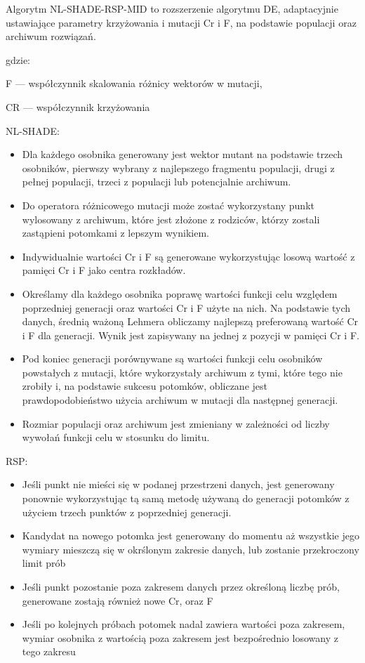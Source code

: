 Algorytm NL-SHADE-RSP-MID to rozszerzenie algorytmu DE, adaptacyjnie ustawiające parametry krzyżowania i mutacji Cr i F, na podstawie populacji oraz archiwum rozwiązań.

gdzie:

F — współczynnik skalowania różnicy wektorów w mutacji,

CR — współczynnik krzyżowania


NL-SHADE: 
\begin{itemize}
    \item Dla każdego osobnika generowany jest wektor mutant na podstawie trzech osobników, pierwszy wybrany z najlepszego fragmentu populacji, drugi z pełnej populacji, trzeci z populacji lub potencjalnie archiwum.

    \item Do operatora różnicowego mutacji może zostać wykorzystany punkt wylosowany z archiwum, które jest złożone z rodziców, którzy zostali zastąpieni potomkami z lepszym wynikiem.

    \item Indywidualnie wartości Cr i F są generowane wykorzystując losową wartość z pamięci Cr i F jako centra rozkładów. 

    \item Określamy dla każdego osobnika poprawę wartości funkcji celu względem poprzedniej generacji oraz wartości Cr i F użyte na nich. Na podstawie tych danych, średnią ważoną Lehmera obliczamy najlepszą preferowaną wartość Cr i F dla generacji. Wynik jest zapisywany na jednej z pozycji w pamięci Cr i F.

    \item Pod koniec generacji porównywane są wartości funkcji celu osobników powstałych z mutacji, które wykorzystały archiwum z tymi, które tego nie zrobiły i, na podstawie sukcesu potomków, obliczane jest prawdopodobieństwo użycia archiwum w mutacji dla następnej generacji.

    \item Rozmiar populacji oraz archiwum jest zmieniany w zależności od liczby wywołań funkcji celu w stosunku do limitu.
    
\end{itemize}

RSP:
\begin{itemize}
    \item Jeśli punkt nie mieści się w podanej przestrzeni danych, jest generowany ponownie wykorzystując tą samą metodę używaną do generacji potomków z użyciem trzech punktów z poprzedniej generacji. 
    \item Kandydat na nowego potomka jest generowany do momentu aż wszystkie jego wymiary mieszczą się w okrślonym zakresie danych, lub zostanie przekroczony limit prób
    \item Jeśli punkt pozostanie poza zakresem danych przez określoną liczbę prób, generowane zostają również nowe Cr, oraz F
    \item Jeśli po kolejnych próbach potomek nadal zawiera wartości poza zakresem, wymiar osobnika z wartością poza zakresem jest bezpośrednio losowany z tego zakresu 
\end{itemize}

